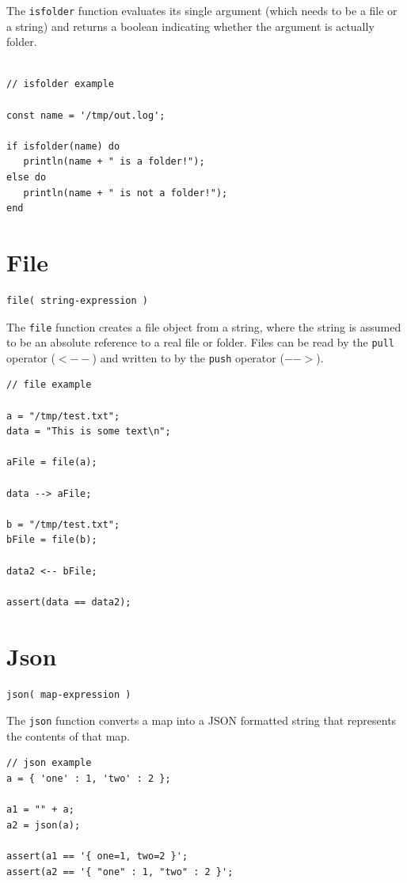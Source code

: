 The \verb+isfolder+ function evaluates its single argument (which needs to be a file or a string) and returns a boolean indicating whether the argument is actually  folder.

\begin{lstlisting}[caption={IsFolder example}]

// isfolder example

const name = '/tmp/out.log';

if isfolder(name) do
   println(name + " is a folder!");
else do
   println(name + " is not a folder!");
end

\end{lstlisting}

\section{File}
\begin{verbatim}
file( string-expression )
\end{verbatim}

The \verb+file+ function creates a \Reflex file object from a string, where the string is assumed to be an absolute reference to a real file or folder. Files can be read by the \verb+pull+ operator ($<--$) and written to by the \verb+push+ operator ($-->$).

\begin{lstlisting}[caption={File example}]
// file example

a = "/tmp/test.txt";
data = "This is some text\n";

aFile = file(a);

data --> aFile;

b = "/tmp/test.txt";
bFile = file(b);

data2 <-- bFile;

assert(data == data2);
\end{lstlisting}

\section{Json}
\begin{verbatim}
json( map-expression )
\end{verbatim}

The \verb+json+ function converts a map into a JSON formatted string that represents the contents of that map.

\begin{lstlisting}[caption={Json example}]
// json example
a = { 'one' : 1, 'two' : 2 };

a1 = "" + a;
a2 = json(a);

assert(a1 == '{ one=1, two=2 }';
assert(a2 == '{ "one" : 1, "two" : 2 }';
\end{lstlisting}

